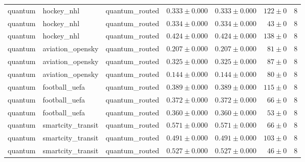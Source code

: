 \begin{table}[htbp]
\begin{tabular}{l l l r r r r}
quantum & hockey\_nhl & quantum\_routed & $0.333\pm0.000$ & $0.333\pm0.000$ & $122\pm0$ & 8 \\
quantum & hockey\_nhl & quantum\_routed & $0.334\pm0.000$ & $0.334\pm0.000$ & $43\pm0$ & 8 \\
quantum & hockey\_nhl & quantum\_routed & $0.424\pm0.000$ & $0.424\pm0.000$ & $138\pm0$ & 8 \\
quantum & aviation\_opensky & quantum\_routed & $0.207\pm0.000$ & $0.207\pm0.000$ & $81\pm0$ & 8 \\
quantum & aviation\_opensky & quantum\_routed & $0.325\pm0.000$ & $0.325\pm0.000$ & $87\pm0$ & 8 \\
quantum & aviation\_opensky & quantum\_routed & $0.144\pm0.000$ & $0.144\pm0.000$ & $80\pm0$ & 8 \\
quantum & football\_uefa & quantum\_routed & $0.389\pm0.000$ & $0.389\pm0.000$ & $115\pm0$ & 8 \\
quantum & football\_uefa & quantum\_routed & $0.372\pm0.000$ & $0.372\pm0.000$ & $66\pm0$ & 8 \\
quantum & football\_uefa & quantum\_routed & $0.360\pm0.000$ & $0.360\pm0.000$ & $53\pm0$ & 8 \\
quantum & smartcity\_transit & quantum\_routed & $0.571\pm0.000$ & $0.571\pm0.000$ & $66\pm0$ & 8 \\
quantum & smartcity\_transit & quantum\_routed & $0.491\pm0.000$ & $0.491\pm0.000$ & $103\pm0$ & 8 \\
quantum & smartcity\_transit & quantum\_routed & $0.527\pm0.000$ & $0.527\pm0.000$ & $46\pm0$ & 8 \\
\hline
\end{tabular}
\end{table}
